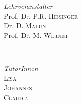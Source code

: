 \begin{titlepage}
\vfill

	\begin{minipage}{0.45\textwidth}
		\begin{flushleft}
			\large
			\textit{Lehrveranstalter}\\
			Prof. Dr. P.R. \textsc{Hiesinger}\\ 
			Dr. D. \textsc{Malun}\\ 
			Prof. Dr. M. \textsc{Wernet}
		\end{flushleft}
	\end{minipage}
	~
		\begin{minipage}{0.45\textwidth}
		\begin{flushright}
			
		\end{flushright}
	\end{minipage}
\vfill
	\begin{minipage}{0.45\textwidth}
		\begin{flushleft}
			\large
			\textit{TutorInnen}\\
			\textsc{Lisa}\\
			\textsc{Johannes}\\
			\textsc{Claudia}
		\end{flushleft}
	\end{minipage}
	~
		\begin{minipage}{0.45\textwidth}
		\begin{flushright}
			
		\end{flushright}
	\end{minipage}

	
	
	\vfill\vfill\vfill %
	
	
	
	 
	
	\vfill %
	
\end{titlepage}

